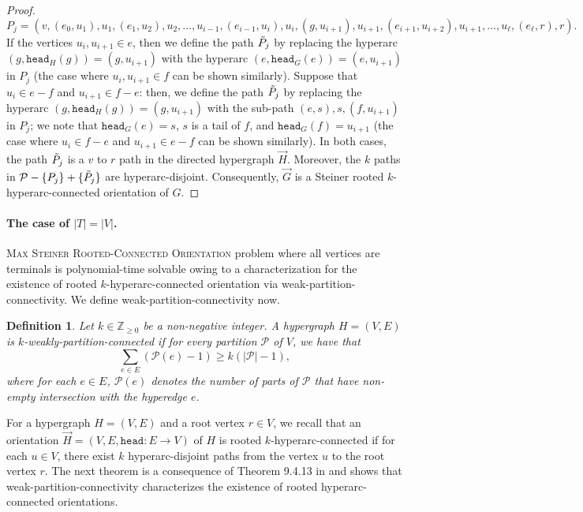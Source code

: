 \documentclass{article}
\newtheorem{definition}{Definition}[section]
\newcommand{\knote}[1]{{\color{red}[{\tiny Karthik: \bf #1}]\marginpar{\color{red}*}}}
\newcommand{\head}{\ensuremath{\texttt{head}}\xspace}
\providecommand{\Z}{\mathbb{Z}}
\providecommand{\calP}{\mathcal{P}}
\begin{document}
\begin{proof}
        $$P_j = \left(v, \left(e_0, u_1\right), u_1, \left(e_1, u_2\right), u_2,  \ldots, u_{i-1}, \left(e_{i-1}, u_{i}\right), u_i, \left(g, u_{i+1}\right), u_{i+1}, \left(e_{i+1}, u_{i+2}\right), u_{i+1}, \ldots, u_{\ell}, \left(e_\ell, r\right), r\right).$$ 
        If the vertices $u_i, u_{i+1} \in e$, then we define the path $\Tilde{P}_j$ by replacing the hyperarc $(g, \head_H(g))=(g, u_{i+1})$ with the hyperarc $(e, \head_G(e))=(e, u_{i+1})$ in $P_j$ (the case where $u_i, u_{i+1} \in f$ can be shown similarly). 
        Suppose that $u_i \in e-f$ and $u_{i+1} \in f-e$: then, we define the path $\Tilde{P}_j$ by replacing the hyperarc $(g, \head_H(g))=(g,u_{i+1})$ with 
        the sub-path $(e, s), s, (f, u_{i+1})$ in $P_j$; we note that $\head_G(e)=s$, $s$ is a tail of $f$, and $\head_G(f)=u_{i+1}$ (the case where $u_i \in f-e$ and $u_{i+1} \in e-f$ can be shown similarly). 
        In both cases, the path $\Tilde{P}_j$ is a $v$ to $r$ path in the directed hypergraph $\overrightarrow{H}$. Moreover, the $k$ paths in $\calP - \{P_j\} + \{\Tilde{P}_j\}$ are hyperarc-disjoint. Consequently, $\overrightarrow{G}$ is a Steiner rooted $k$-hyperarc-connected orientation of $G$.
\end{proof}

\paragraph{The case of $|T|=|V|$. } \textsc{Max Steiner Rooted-Connected Orientation} problem where all vertices are terminals is polynomial-time solvable owing to a characterization for the existence of rooted $k$-hyperarc-connected orientation via weak-partition-connectivity. We define weak-partition-connectivity now. 
\begin{definition}\label{defn:weak-partition-connectivity}
    Let $k \in \Z_{\geq 0}$ be a non-negative integer. A hypergraph $H = (V, E)$ is \emph{$k$-weakly-partition-connected} if for every partition $\calP$ of $V$, we have that $$\sum_{e \in E} \left(\calP\left(e\right) - 1\right) \geq k (|\calP| - 1),$$
    where for each $e \in E$, $\calP(e)$ denotes the number of parts of $\calP$ that have non-empty intersection with the hyperedge $e$. 
\end{definition}

For a hypergraph $H=(V, E)$ and a root vertex $r\in V$, we recall that an orientation $\overrightarrow{H}=(V, E, \head: E\rightarrow V)$ of $H$ is rooted $k$-hyperarc-connected if for each $u\in V$, there exist $k$ hyperarc-disjoint paths 
from the vertex $u$ to the root vertex $r$. 
The next theorem is a consequence of Theorem 9.4.13 in \cite{Frank-book} and shows that weak-partition-connectivity characterizes the existence of rooted hyperarc-connected orientations. 
\end{document}
